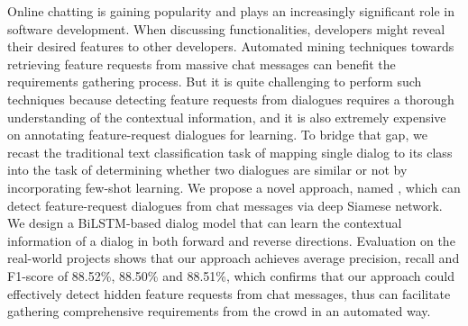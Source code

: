 Online chatting is gaining popularity and plays an increasingly significant role in software development. When discussing functionalities, developers might reveal their desired features to other developers. Automated mining techniques towards retrieving feature requests from massive chat messages can benefit the requirements gathering process. But it is quite challenging to perform such techniques because detecting feature requests from dialogues requires a thorough understanding of the contextual information, and it is also extremely expensive on annotating feature-request dialogues for learning. 
To bridge that gap, we recast the traditional text classification task of mapping single dialog to its class into the task of determining whether two dialogues are similar or not by incorporating few-shot learning. We
propose a novel approach, named {\tool}, which can detect feature-request dialogues from chat messages via deep Siamese network. We design a BiLSTM-based dialog model that can learn the contextual information of a dialog in both forward and reverse directions.
Evaluation on the real-world projects shows that our approach achieves average precision, recall and F1-score of 88.52\%, 88.50\% and 88.51\%, which confirms that our approach could effectively detect hidden feature requests from chat messages, thus can facilitate gathering comprehensive requirements from the crowd in an automated way. 

